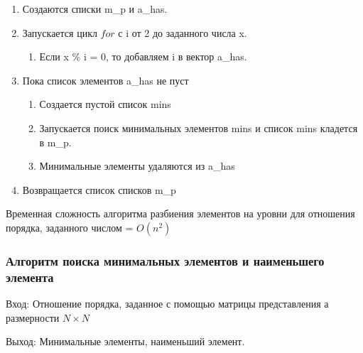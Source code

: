 \documentclass[bachelor, och, labwork]{shiza}
\begin{document}
		\begin{enumerate} 
		\item Создаются списки m\_p и a\_has. 
		\item Запускается цикл $for$ с i от 2 до заданного числа x. 
			\begin{enumerate} 
				\item Если x $\%$ i = 0, то добавляем i в вектор a\_has.
			\end{enumerate} 
		\item Пока список элементов a\_has не пуст
			\begin{enumerate} 
					\item Создается пустой список mins
					\item Запускается поиск минимальных элементов mins и список mins кладется в m\_p.
					\item Минимальные элементы удаляются из a\_has
			\end{enumerate} 
		\item Возвращается список списков m\_p
		\end{enumerate} 

	Временная сложность алгоритма разбиения элементов на уровни для отношения порядка, заданного числом = $O(n^2)$	
	

		\subsubsection{Алгоритм поиска минимальных элементов и наименьшего элемента}

	$\textit{Вход:}$ Отношение порядка, заданное с помощью матрицы представления а размерности $N \times N$
	
	$\textit{Выход:}$  Минимальные элементы, наименьший элемент.
\end{document}
